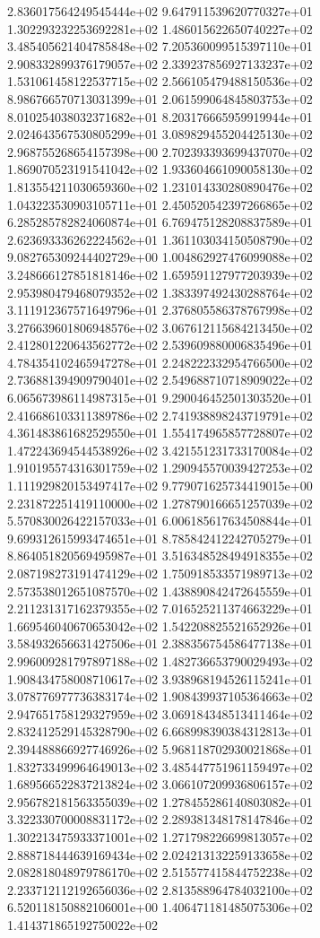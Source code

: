 2.836017564249545444e+02 9.647911539620770327e+01 1.302293232253692281e+02
1.486015622650740227e+02 3.485405621404785848e+02 7.205360099515397110e+01
2.908332899376179057e+02 2.339237856927133237e+02 1.531061458122537715e+02
2.566105479488150536e+02 8.986766570713031399e+01 2.061599064845803753e+02
8.010254038032371682e+01 8.203176665959919944e+01 2.024643567530805299e+01
3.089829455204425130e+02 2.968755268654157398e+00 2.702393393699437070e+02
1.869070523191541042e+02 1.933604661090058130e+02 1.813554211030659360e+02
1.231014330280890476e+02 1.043223530903105711e+01 2.450520542397266865e+02
6.285285782824060874e+01 6.769475128208837589e+01 2.623693336262224562e+01
1.361103034150508790e+02 9.082765309244402729e+00 1.004862927476099088e+02
3.248666127851818146e+02 1.659591127977203939e+02 2.953980479468079352e+02
1.383397492430288764e+02 3.111912367571649796e+01 2.376805586378767998e+02
3.276639601806948576e+02 3.067612115684213450e+02 2.412801220643562772e+02
2.539609880006835496e+01 4.784354102465947278e+01 2.248222332954766500e+02
2.736881394909790401e+02 2.549688710718909022e+02 6.065673986114987315e+01
9.290046452501303520e+01 2.416686103311389786e+02 2.741938898243719791e+02
4.361483861682529550e+01 1.554174965857728807e+02 1.472243694544538926e+02
3.421551231733170084e+02 1.910195574316301759e+02 1.290945570039427253e+02
1.111929820153497417e+02 9.779071625734419015e+00 2.231872251419110000e+02
1.278790166651257039e+02 5.570830026422157033e+01 6.006185617634508844e+01
9.699312615993474651e+01 8.785842412242705279e+01 8.864051820569495987e+01
3.516348528494918355e+02 2.087198273191474129e+02 1.750918533571989713e+02
2.573538012651087570e+02 1.438890842472645559e+01 2.211231317162379355e+02
7.016525211374663229e+01 1.669546040670653042e+02 1.542208825521652926e+01
3.584932656631427506e+01 2.388356754586477138e+01 2.996009281797897188e+02
1.482736653790029493e+02 1.908434758008710617e+02 3.938968194526115241e+01
3.078776977736383174e+02 1.908439937105364663e+02 2.947651758129327959e+02
3.069184348513411464e+02 2.832412529145328790e+02 6.668998390384312813e+01
2.394488866927746926e+02 5.968118702930021868e+01 1.832733499964649013e+02
3.485447751961159497e+02 1.689566522837213824e+02 3.066107209936806157e+02
2.956782181563355039e+02 1.278455286140803082e+01 3.322330700008831172e+02
2.289381348178147846e+02 1.302213475933371001e+02 1.271798226699813057e+02
2.888718444639169434e+02 2.024213132259133658e+02 2.082818048979786170e+02
2.515577415844752238e+02 2.233712112192656036e+02 2.813588964784032100e+02
6.520118150882106001e+00 1.406471181485075306e+02 1.414371865192750022e+02
